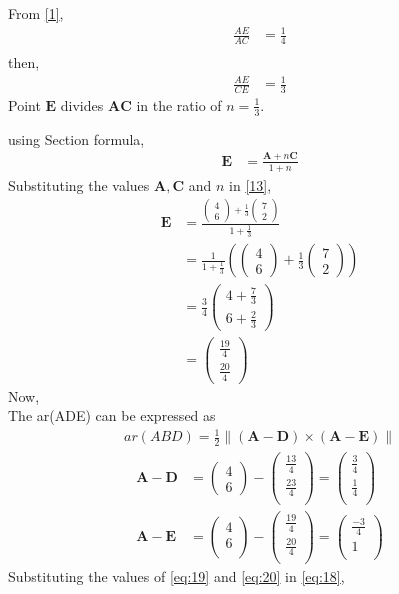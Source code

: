 \documentclass[12pt]{article}
\providecommand{\brak}[1]{\ensuremath{\left(#1\right)}}
\providecommand{\norm}[1]{\left\lVert#1\right\rVert}
\newcommand{\myvec}[1]{\ensuremath{\begin{pmatrix}#1\end{pmatrix}}}
\let\vec\mathbf
\begin{document}
\begin{enumerate}
From \eqref{1},
\begin{align}
\frac{AE}{AC} &=\frac{1}{4}\\
\end{align}
then,
\begin{align}
\frac{AE}{CE} &=\frac{1}{3}
\end{align}
Point $\vec{E}$ divides $\vec{A}\vec{C}$ in the ratio of $n = \frac{1}{3}$.

using Section formula,
\begin{align}
\vec{E} &=\frac{\vec{A}+n\vec{C}}{1+n}\label{13}
\end{align}
Substituting the values $\vec{A},\vec{C}$ and $n$ in \eqref{13},
\begin{align}
\vec{E} &=\frac{{\myvec{4\\6}+\frac{1}{3}\myvec{7\\2}}}{1+\frac{1}{3}}\\
	&=\frac{1}{1+\frac{1}{3}}\brak{{\myvec{4\\6}+\frac{1}{3}\myvec{7\\2}}} \\
	&=\frac{3}{4}\myvec{4+\frac{7}{3}\\[2pt]6+\frac{2}{3}}\\
	&=\myvec{\frac{19}{4}\\[2pt] \frac{20}{4}}
\end{align}
Now,\\
		The ar(ADE) can be expressed as
  \begin{align}
	  ar(ABD)=\frac{1}{2} \norm{\brak{\vec{A}-\vec{D}}  \times 
   \brak{\vec{A}- \vec{E}}} \label{eq:18} 
\end{align}
\begin{align}
	\vec{A}- \vec{D} &= \myvec{4\\6}-\myvec{\frac{13}{4}\\[2pt] \frac{23}{4}\\}=\myvec{\frac{3}{4}\\[2pt] \frac{1}{4}\\}\label{eq:19}\\
	  \vec{A}- \vec{E} &= \myvec{4\\6\\}-\myvec{\frac{19}{4}\\[2pt] \frac{20}{4}\\}=\myvec{\frac{-3}{4}\\[2pt]1\\}\label{eq:20}
  \end{align}
Substituting the values of \eqref{eq:19} and \eqref{eq:20} in \eqref{eq:18},

\end{enumerate}
\end{document}
